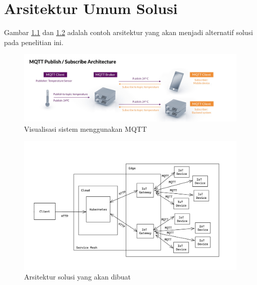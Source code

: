 \chapter{Arsitektur Umum Solusi}
\label{appendix:gambaran-umum-solusi}
Gambar \ref{fig:mqtt-architecture-image} dan \ref{fig:appendix-gambaran-umum-solusi} adalah contoh arsitektur yang akan menjadi alternatif solusi pada penelitian ini.

\begin{figure}[h]
  \centering
  \includegraphics[width=1\textwidth]{resources/appendix/arsitektur-mqtt.jpg}
  \caption{Visualisasi sistem menggunakan MQTT \parencite{mqtt}}
  \label{fig:mqtt-architecture-image}
\end{figure}

\begin{figure}[h]
  \centering
  \includegraphics[width=1\textwidth]{resources/appendix/gambaran-umum-solusi.jpg}
  \caption{Arsitektur solusi yang akan dibuat}
  \label{fig:appendix-gambaran-umum-solusi}
\end{figure}